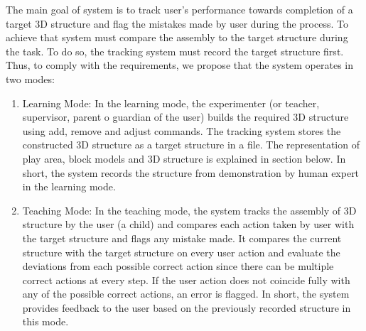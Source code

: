 The main goal of system is to track user's performance towards completion of a target 3D structure and flag the mistakes made by user during the process. To achieve that system must compare the assembly to the target structure during the task. To do so, the tracking system must record the target structure first. Thus, to comply with the requirements, we propose that the system operates in two modes:
\begin{enumerate}
    \item Learning Mode: In the learning mode, the experimenter (or teacher, supervisor, parent o guardian of the user) builds the required 3D structure using add, remove and adjust commands. The tracking system stores the constructed 3D structure as a target structure in a file. The representation of play area, block models and 3D structure is explained in section below. In short, the system records the structure from demonstration by human expert in the learning mode. 
    \item Teaching Mode: In the teaching mode, the system tracks the assembly of 3D structure by the user (a child) and compares each action taken by user with the target structure and flags any mistake made. It compares the current structure with the target structure on every user action and evaluate the deviations from each possible correct action since there can be multiple correct actions at every step. If the user action does not coincide fully with any of the possible correct actions, an error is flagged. In short, the system provides feedback to the user based on the previously recorded structure in this mode.
\end{enumerate}

